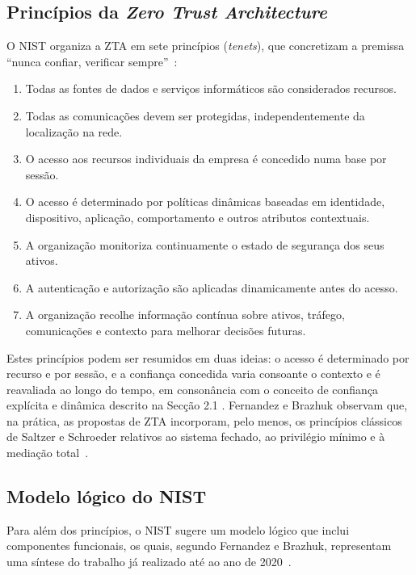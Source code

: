 \documentclass{llncs}
\begin{document}
\subsection{Princípios da \textit{Zero Trust Architecture}}

O NIST organiza a ZTA em sete princípios (\textit{tenets}), que
concretizam a premissa ``nunca confiar, verificar sempre''~\cite{rose2020}:

\begin{enumerate}
  \item Todas as fontes de dados e serviços informáticos são considerados recursos.
  \item Todas as comunicações devem ser protegidas, independentemente da localização na rede.
  \item O acesso aos recursos individuais da empresa é concedido numa base por sessão.
  \item O acesso é determinado por políticas dinâmicas baseadas em identidade, dispositivo, aplicação, comportamento e outros atributos contextuais.
  \item A organização monitoriza continuamente o estado de segurança dos seus ativos.
  \item A autenticação e autorização são aplicadas dinamicamente antes do acesso.
  \item A organização recolhe informação contínua sobre ativos, tráfego, comunicações e contexto para melhorar decisões futuras.
\end{enumerate}

Estes princípios podem ser resumidos em duas ideias: o acesso é determinado por recurso e
por sessão, e a confiança concedida varia consoante o contexto e é reavaliada ao longo
do tempo, em consonância com o conceito de confiança explícita e dinâmica descrito na
Secção 2.1 \cite{kang2023}. Fernandez e Brazhuk observam que, na prática, as propostas de ZTA
incorporam, pelo menos, os princípios clássicos de Saltzer e Schroeder relativos ao
sistema fechado, ao privilégio mínimo e à mediação total~\cite{fernandez2024}.

\subsection{Modelo lógico do NIST}

Para além dos princípios, o NIST sugere um modelo lógico que inclui componentes funcionais,
os quais, segundo Fernandez e Brazhuk, representam uma síntese do trabalho já realizado
até ao ano de 2020~\cite{fernandez2024}. 
\end{document}
